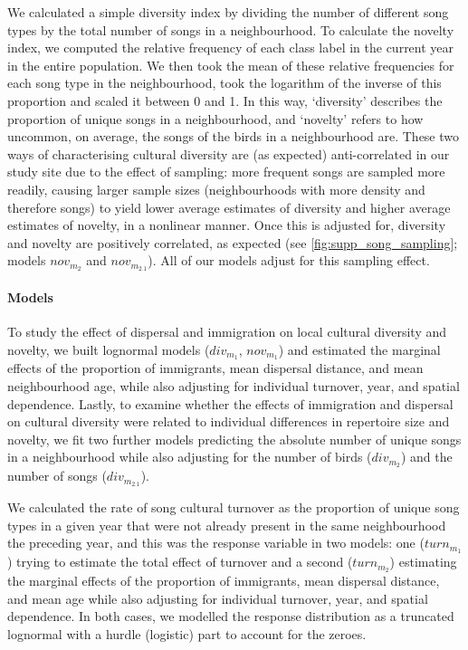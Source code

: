We calculated a simple diversity index by dividing the number of different song types by the total number of songs in a neighbourhood. To calculate the novelty index, we computed the relative frequency of each class label in the current year in the entire population. We then took the mean of these relative frequencies for each song type in the neighbourhood, took the logarithm of the inverse of this proportion and scaled it between 0 and 1. In this way, ‘diversity’ describes the proportion of unique songs in a neighbourhood, and ‘novelty’ refers to how uncommon, on average, the songs of the birds in a neighbourhood are. These two ways of characterising cultural diversity are (as expected) anti-correlated in our study site due to the effect of sampling: more frequent songs are sampled more readily, causing larger sample sizes (neighbourhoods with more density and therefore songs) to yield lower average estimates of diversity and higher average estimates of novelty, in a nonlinear manner. Once this is adjusted for, diversity and novelty are positively correlated, as expected (see \autoref{fig:supp_song_sampling}; models $nov_{m_2}$ and $nov_{m_{2.1}}$). All of our models adjust for this sampling effect.

\paragraph{Models}

To study the effect of dispersal and immigration on local cultural diversity and novelty, we built lognormal models ($div_{m_1}$, $nov_{m_1}$) and estimated the marginal effects of the proportion of immigrants, mean dispersal distance, and mean neighbourhood age, while also adjusting for individual turnover, year, and spatial dependence. Lastly, to examine whether the effects of immigration and dispersal on cultural diversity were related to individual differences in repertoire size and novelty, we fit two further models predicting the absolute number of unique songs in a neighbourhood while also adjusting for the number of birds ($div_{m_2}$) and the number of songs ($div_{m_{2.1}}$).

We calculated the rate of song cultural turnover as the proportion of unique song types in a given year that were not already present in the same neighbourhood the preceding year, and this was the response variable in two models: one ($turn_{m_1}$) trying to estimate the total effect of turnover and a second ($turn_{m_2}$) estimating the marginal effects of the proportion of immigrants, mean dispersal distance, and mean age while also adjusting for individual turnover, year, and spatial dependence. In both cases, we modelled the response distribution as a truncated lognormal with a hurdle (logistic) part to account for the zeroes. 



